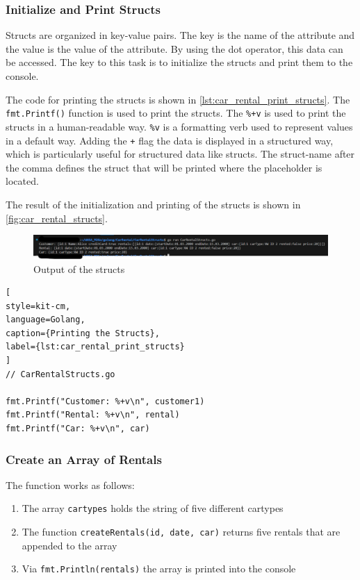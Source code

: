 \subsubsection*{Initialize and Print Structs}
Structs are organized in key-value pairs.
The key is the name of the attribute and the value is the value of the attribute.
By using the dot operator, this data can be accessed.
The key to this task is to initialize the structs and print them to the console.

The code for printing the structs is shown in \autoref{lst:car_rental_print_structs}.
The \texttt{fmt.Printf()} function is used to print the structs.
The \texttt{\%+v} is used to print the structs in a human-readable way.
\texttt{\%v} is a formatting verb used to represent values in a default way.
Adding the \texttt{+} flag the data is displayed in a structured way, which is particularly useful for structured data like structs.
The struct-name after the comma defines the struct that will be printed where the placeholder is located.

The result of the initialization and printing of the structs is shown in \autoref{fig:car_rental_structs}.
\begin{figure}[H]
    \centering
    \includegraphics[width=\textwidth]{figures/goLang/carRental/carRental_structs.png}
    \caption{Output of the structs}
    \label{fig:car_rental_structs}
\end{figure}

\begin{lstlisting}[
style=kit-cm,
language=Golang,
caption={Printing the Structs},
label={lst:car_rental_print_structs}
]
// CarRentalStructs.go

fmt.Printf("Customer: %+v\n", customer1)
fmt.Printf("Rental: %+v\n", rental)
fmt.Printf("Car: %+v\n", car)
\end{lstlisting}

\subsubsection*{Create an Array of Rentals}
The function works as follows:
\begin{enumerate}
    \item The array \texttt{cartypes} holds the string of five different cartypes
    \item The function \texttt{createRentals(id, date, car)} returns five rentals that are appended to the array
    \item Via \texttt{fmt.Println(rentals)} the array is printed into the console
\end{enumerate}

